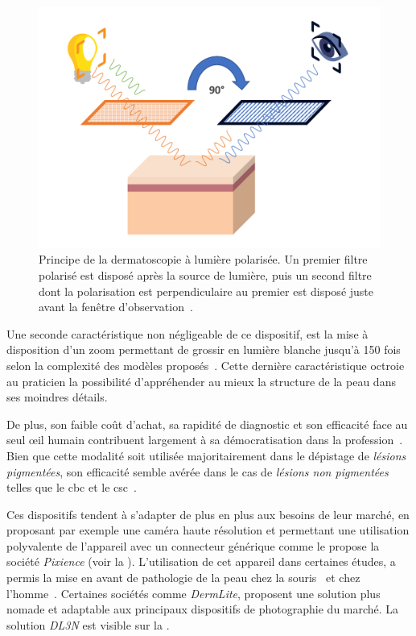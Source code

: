 \begin{figure}[H]
\centering
    \includegraphics[width=0.9\linewidth]{contents/chapter_2/resources/scheme_polarized_dermoscopy.pdf}
    \caption{Principe de la dermatoscopie à lumière polarisée. Un premier filtre polarisé est disposé après la source de lumière, puis un second filtre dont la polarisation est perpendiculaire au premier est disposé juste avant la fenêtre d'observation~\cite{sonthalia2019}.}
    \label{fig:scheme_polarized_dermoscopy}
\end{figure}\par

Une seconde caractéristique non négligeable de ce dispositif, est la mise à disposition d’un zoom permettant de grossir en lumière blanche jusqu'à 150 fois selon la complexité des modèles proposés~\cite{Campos-do-Carmo2008}. Cette dernière caractéristique octroie au praticien la possibilité d’appréhender au mieux la structure de la peau dans ses moindres détails.\par

De plus, son faible coût d’achat, sa rapidité de diagnostic et son efficacité face au seul œil humain contribuent largement à sa démocratisation dans la profession~\cite{Lallas2013}. Bien que cette modalité soit utilisée majoritairement dans le dépistage de \textit{lésions pigmentées}, son efficacité semble avérée dans le cas de \textit{lésions non pigmentées} telles que le \gls{cbc} et le \gls{csc}~\cite{Lallas2013}.\par

Ces dispositifs tendent à s'adapter de plus en plus aux besoins de leur marché, en proposant par exemple une caméra haute résolution et permettant une utilisation polyvalente de l'appareil avec un connecteur générique comme le propose la société \textit{Pixience} (voir la ). L'utilisation de cet appareil dans certaines études, a permis la mise en avant de pathologie de la peau chez la souris~\cite{Pillon2017} et chez l'homme~\cite{Cinotti2016}. Certaines sociétés comme \textit{DermLite}, proposent une solution plus nomade et adaptable aux principaux dispositifs de photographie du marché. La solution \textit{DL3N} est visible sur la .\par

